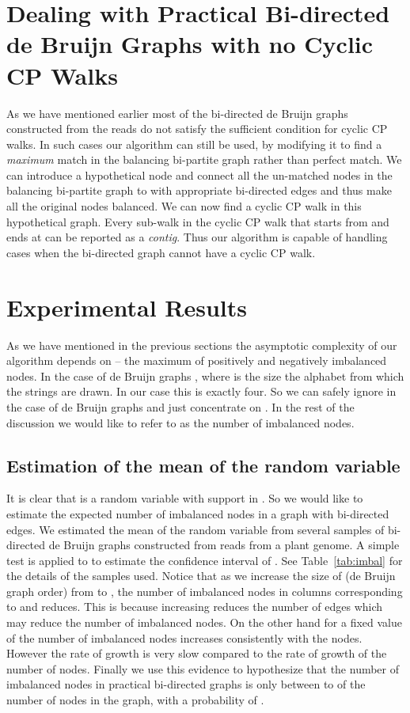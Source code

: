 \documentclass[runningheads]{llncs}
\begin{document}
\section{Dealing with Practical Bi-directed de Bruijn Graphs with no Cyclic CP Walks}
\label{sec:no-cpp}
As we have mentioned earlier most of the bi-directed de Bruijn graphs constructed from the
reads do not satisfy the sufficient condition for cyclic CP walks. In such cases our algorithm
can still be used, by modifying it to find a {\em maximum} match in the balancing bi-partite graph  
rather than perfect match. We can introduce a hypothetical node  and connect all the 
un-matched nodes in the balancing bi-partite graph to  with appropriate bi-directed edges and
thus make all the original nodes balanced. We can now find a cyclic CP walk in this hypothetical 
graph. Every sub-walk in the cyclic CP walk that starts from  and ends at  can be reported
as a {\em contig}. Thus our algorithm is capable of handling cases when the bi-directed graph cannot have a cyclic CP walk.

\section{Experimental Results}
\label{sec:exp}
As we have mentioned in the previous sections the asymptotic complexity of our algorithm depends on 
 -- the maximum of positively and negatively imbalanced nodes. In the case of de Bruijn
graphs , where  is the size the alphabet from which the strings
are drawn. In our case this is exactly four. So we can safely ignore  in the case of de Bruijn
graphs and just concentrate on . In the rest of the discussion we would like to refer to 
as the number of imbalanced nodes.
\subsection{Estimation of the mean of the random variable }
It is clear that  is a random variable with support in . So we would like to 
estimate the expected number of imbalanced nodes in a graph with  bi-directed edges. We
estimated the mean of the random variable  from several samples of bi-directed
de Bruijn graphs constructed from reads from a plant genome. A simple test is applied to 
to estimate the  confidence interval of . See Table~\ref{tab:imbal} for
the details of the samples used. Notice that as we increase the size of  (de Bruijn graph
order) from  to , the number of imbalanced nodes in columns corresponding to 
and  reduces. This is because increasing  reduces the number of edges which may reduce
the number of imbalanced nodes. On the other hand for a fixed value of  the number of
imbalanced nodes increases consistently with the nodes. However the rate of growth is very
slow compared to the rate of growth of the number of nodes. Finally we use this evidence to hypothesize
that the number of imbalanced nodes in practical bi-directed graphs is only between 
to  of the number of nodes in the graph, with a probability of .
\end{document}
